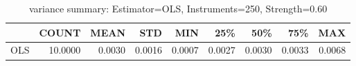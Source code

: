 \begin{table}[ht]
\centering
\caption{variance summary: Estimator=OLS, Instruments=250, Strength=0.60}
\begin{tabular}{lrrrrrrrr}
\toprule
 & COUNT & MEAN & STD & MIN & 25\% & 50\% & 75\% & MAX \\
\midrule
OLS & 10.0000 & 0.0030 & 0.0016 & 0.0007 & 0.0027 & 0.0030 & 0.0033 & 0.0068 \\
\bottomrule
\end{tabular}
\end{table}
